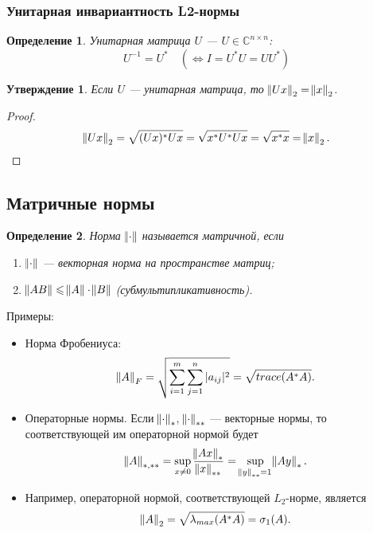 \documentclass[a4paper, 12pt]{article}
\renewcommand{\le}{\ensuremath{\leqslant}}
\newcommand{\CC}{\mathbb{C}}
\newtheorem{definition}{Определение}[section]
\newtheorem{assertion}{Утверждение}[section]
\begin{document}
\subsubsection{Унитарная инвариантность L2-нормы}

\begin{definition}
    Унитарная матрица $U$ --- $U \in \CC^{n\times n}$:
    \[
        U^{-1} = U^* \quad (\Leftrightarrow I = U^* U = U U^*)
    \]
\end{definition}

\begin{assertion}
    Если $U$ --- унитарная матрица, то $\norm{U x}_2 = \norm{x}_2$.
\end{assertion}

\begin{proof}
    \[
        \norm{U x}_2 = \sqrt{(U x)^* U x} = \sqrt{x^* U^* U x} = \sqrt{x^* x}
        = \norm{x}_2.
    \]
\end{proof}

\subsection{Матричные нормы}

\begin{definition}
    Норма $\norm{\cdot}$ называется матричной, если
    \begin{enumerate}
        \item $\norm{\cdot}$ --- векторная норма на пространстве матриц;
        \item $\norm{A B} \le \norm{A} \cdot \norm{B}$ (субмультипликативность).
    \end{enumerate}
\end{definition}

Примеры:

\begin{itemize}
    \item Норма Фробениуса:
        \[
            \norm{A}_F = \sqrt{\sum_{i = 1}^m \sum_{j = 1}^n |a_{i j}|^2}
            = \sqrt{trace(A^* A)}.
        \]
    \item Операторные нормы. Если $\norm{\cdot}_*$,\; $\norm{\cdot}_{**}$
        --- векторные нормы, то соответствующей им операторной нормой будет
        \[
            \norm{A}_{*, **} = \sup_{x \ne 0} \frac{\norm{A x}_*}{\norm{x}_{**}}
            = \sup_{\norm{y}_{**} = 1} \norm{A y}_{*}.
        \]
    \item Например, операторной нормой, соответствующей $L_2$-норме, является
        \[
            \norm{A}_2 = \sqrt{\lambda_{max}(A^* A)} = \sigma_1(A).
        \]
\end{itemize}
\end{document}
